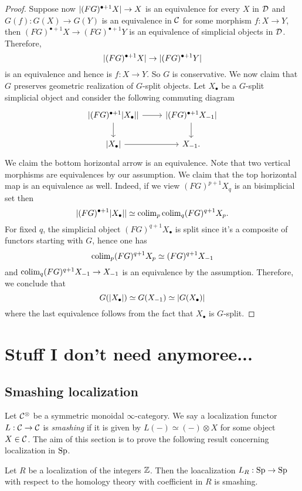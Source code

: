 \begin{proof}
	Suppose now $\lvert(FG)^{\bullet+1}X\rvert \to X$ is an equivalence for every $X$ in ${\mathcal{D}}$ and $G(f): G(X) \to G(Y)$ is an equivalence in ${\mathcal{C}}$ for some morphism $f:X \to Y$, then $(FG)^{\bullet+1} X \to (FG)^{\bullet+1}Y$ is an equivalence of simplicial objects in ${\mathcal{D}}$. Therefore, 
	$$
	\lvert(FG)^{\bullet+1} X\rvert \to \lvert(FG)^{\bullet+1} Y\rvert
	$$
	is an equivalence and hence is $f: X\to Y$. So $G$ is conservative.
	We now claim that $G$ preserves geometric realization of $G$-split objects.
	Let $X_{\bullet}$ be a $G$-split simplicial object and consider the following commuting diagram
	\[
	\begin{tikzcd}
		\abs{(FG)^{\bullet+1} \abs{X_{\bullet}}} \ar[r] \ar[d]& \abs{(FG)^{\bullet+1} X_{-1} \ar[d]}     \\
		\abs{X_{\bullet}} \ar[r] & X_{-1}  .
	\end{tikzcd}
	\]
	We claim the bottom horizontal arrow is an equivalence.
	Note that two vertical morphisms are equivalences by our assumption. We claim that the top horizontal map is an equivalence as well. Indeed, if we view $(FG)^{p+1} X_{q}$ is an bisimplicial set then 
	$$
	\lvert(FG)^{\bullet+1} \lvert X_{\bullet}\rvert\rvert 
	\simeq 
	\operatorname{colim}_{p} \operatorname{colim}_q (FG)^{q+1}X_{p} .
	$$
	For fixed $q$, the simplicial object $(FG)^{q+1}X_{\bullet}$ is split since it's a composite of functors starting with $G$, hence one has 
	$$
	\operatorname{colim}_{p}(FG)^{q+1}X_{p}\simeq (FG)^{q+1}X_{-1}
	$$
	and $\operatorname{colim}_{q} (FG)^{q+1} X_{-1} \to X_{-1}$  is an equivalence by the assumption.
	Therefore, we conclude that 
	$$
	G(\lvert X_{\bullet}\rvert) \simeq G(X_{-1}) \simeq \lvert G(X_{\bullet})\rvert
	$$
	where the last equivalence follows from the fact that $X_{\bullet}$ is $G$-split.
\end{proof}

\section{Stuff I don't need anymoree...}

\subsection{Smashing localization}
Let ${\mathcal{C}}^{\otimes}$ be a symmetric monoidal $\infty$-category. We say a localization functor $L:{\mathcal{C}}\to{\mathcal{C}}$ is \emph{smashing} if it is given by $L(-)\simeq (-)\otimes X$ for some object $X\in{\mathcal{C}}$.
The aim of this section is to prove the following result concerning localization in $\operatorname{Sp}$.

\begin{proposition}
\label{HR is smashing}
	Let $R$ be a localization of the integers ${\mathbb{Z}}$. Then the loacalization $L_R:\operatorname{Sp}\to \operatorname{Sp}$ with respect to the homology theory with coefficient in $R$ is smashing.
\end{proposition}

